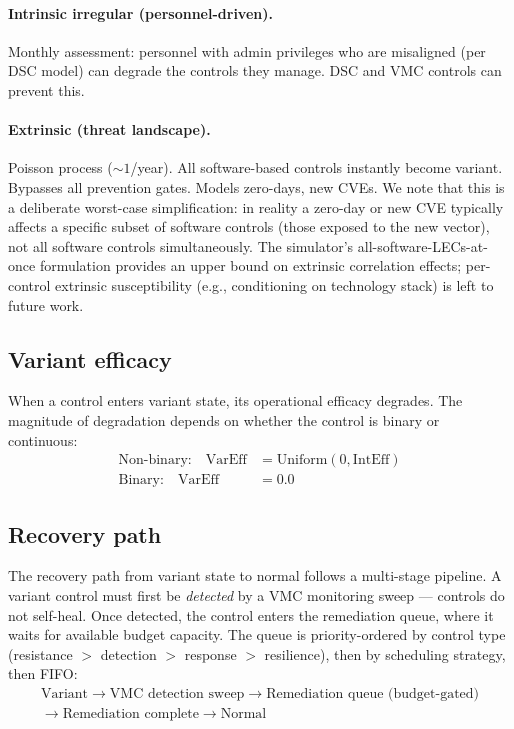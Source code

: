 \documentclass[11pt,a4paper]{article}
\begin{document}
\paragraph{Intrinsic irregular (personnel-driven).} Monthly assessment: personnel with admin privileges who are misaligned (per DSC model) can degrade the controls they manage. DSC and VMC controls can prevent this.

\paragraph{Extrinsic (threat landscape).} Poisson process (${\sim}1$/year). All software-based controls instantly become variant. Bypasses all prevention gates. Models zero-days, new CVEs. We note that this is a deliberate worst-case simplification: in reality a zero-day or new CVE typically affects a specific subset of software controls (those exposed to the new vector), not all software controls simultaneously. The simulator's all-software-LECs-at-once formulation provides an upper bound on extrinsic correlation effects; per-control extrinsic susceptibility (e.g., conditioning on technology stack) is left to future work.

\subsection{Variant efficacy}

When a control enters variant state, its operational efficacy degrades. The magnitude of degradation depends on whether the control is binary or continuous:
\begin{align}
    \text{Non-binary:} \quad \mathrm{VarEff} &= \mathrm{Uniform}(0, \mathrm{IntEff}) \\
    \text{Binary:} \quad \mathrm{VarEff} &= 0.0
\end{align}

\subsection{Recovery path}

The recovery path from variant state to normal follows a multi-stage pipeline. A variant control must first be \emph{detected} by a VMC monitoring sweep --- controls do not self-heal. Once detected, the control enters the remediation queue, where it waits for available budget capacity. The queue is priority-ordered by control type (resistance $>$ detection $>$ response $>$ resilience), then by scheduling strategy, then FIFO:
\begin{multline*}
    \text{Variant} \to \text{VMC detection sweep} \to \text{Remediation queue (budget-gated)} \\
    \to \text{Remediation complete} \to \text{Normal}
\end{multline*}
\end{document}

